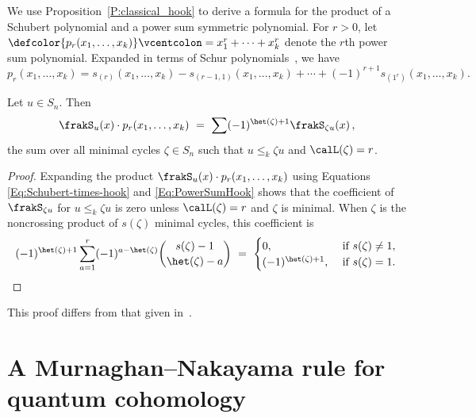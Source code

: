 We use Proposition~\ref{P:classical_hook} to derive a formula for the product of a Schubert polynomial and
a power sum symmetric polynomial.
For $r>0$, let $\defcolor{p_r(x_1,\dotsc,x_k)}\vcentcolon=x_1^r+\dotsb+x_k^r$ denote the $r$th power sum polynomial.
Expanded in terms of Schur polynomials~\cite{Macdonald}, we have
 \begin{equation}\label{Eq:PowerSumHook}
    p_r(x_1, \ldots, x_k) =
    s_{(r)}(x_1, \ldots, x_k) - s_{(r-1,1)}(x_1, \ldots, x_k) + \cdots + (-1)^{r+1} s_{(1^r)}(x_1, \ldots, x_k).
\end{equation}

\begin{corollary}
    \label{C:classical-schubert-times-powersum}
    Let $u \in S_n$.
    Then
     \begin{equation*}
      \frakS_u(x) \cdot p_r(x_1,\dotsc,x_k)\ =\ \sum (-1)^{\het(\zeta)+1} \frakS_{\zeta u}(x)\,,
     \end{equation*}
    the sum over all minimal cycles $\zeta \in S_n$ such that
    $u\leq_k\zeta u$ and $\calL(\zeta)=r$.
\end{corollary}

\begin{proof}
    Expanding the  product $\frakS_u(x) \cdot p_r(x_1,\dotsc,x_k)$ using Equations
    \eqref{Eq:Schubert-times-hook}
    and
    \eqref{Eq:PowerSumHook}
    shows
    that
    the coefficient of $\frakS_{\zeta u}$ for $u\leq_k\zeta u$ is zero unless
    $\calL(\zeta)=r$ and $\zeta$ is minimal.
    When $\zeta$ is the noncrossing product of $s(\zeta)$ minimal cycles, this coefficient is
    \begin{equation*}
        (-1)^{\het(\zeta)+1} \sum_{a=1}^{r} (-1)^{a-\het(\zeta)}\binom{s(\zeta)-1}{\het(\zeta)-a}\ =\
        \begin{cases}
            0,  & \text{ if } s(\zeta)\neq 1,\\
            (-1)^{\het(\zeta)+1},& \text{ if } s(\zeta)=1.
        \end{cases}
        \qedhere
    \end{equation*}
\end{proof}

This proof differs from that given in~\cite{Morrison, MorrisonSottile}.

\section{A Murnaghan--Nakayama rule for quantum cohomology}
\label{S:qCoh}

